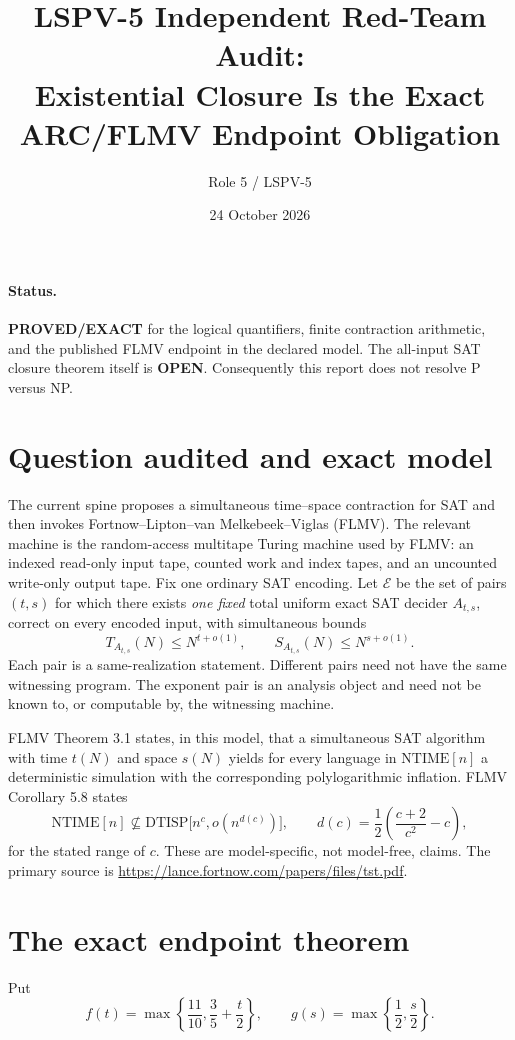\documentclass[11pt]{article}
\title{LSPV-5 Independent Red-Team Audit:\\
Existential Closure Is the Exact ARC/FLMV Endpoint Obligation}
\author{Role 5 / LSPV-5}
\date{24 October 2026}
\newcommand{\E}{\mathcal E}
\begin{document}
\maketitle

\paragraph{Status.}
\textbf{PROVED/EXACT} for the logical quantifiers, finite contraction arithmetic,
and the published FLMV endpoint in the declared model.  The all-input SAT
closure theorem itself is \textbf{OPEN}.  Consequently this report does not
resolve P versus NP.

\section{Question audited and exact model}
The current spine proposes a simultaneous time--space contraction for SAT and
then invokes Fortnow--Lipton--van Melkebeek--Viglas (FLMV).  The relevant
machine is the random-access multitape Turing machine used by FLMV: an indexed
read-only input tape, counted work and index tapes, and an uncounted write-only
output tape.  Fix one ordinary SAT encoding.  Let $\E$ be the set of pairs
$(t,s)$ for which there exists \emph{one fixed} total uniform exact SAT decider
$A_{t,s}$, correct on every encoded input, with simultaneous bounds
\[
 T_{A_{t,s}}(N)\le N^{t+o(1)},\qquad
 S_{A_{t,s}}(N)\le N^{s+o(1)}.
\]
Each pair is a same-realization statement.  Different pairs need not have the
same witnessing program.  The exponent pair is an analysis object and need not
be known to, or computable by, the witnessing machine.

FLMV Theorem 3.1 states, in this model, that a simultaneous SAT algorithm with
time $t(N)$ and space $s(N)$ yields for every language in $\mathrm{NTIME}[n]$
a deterministic simulation with the corresponding polylogarithmic inflation.
FLMV Corollary 5.8 states
\[
 \mathrm{NTIME}[n]\not\subseteq
 \mathrm{DTISP}\bigl[n^c,o(n^{d(c)})\bigr],\qquad
 d(c)=\frac12\left(\frac{c+2}{c^2}-c\right),
\]
for the stated range of $c$.  These are model-specific, not model-free,
claims.  The primary source is
\url{https://lance.fortnow.com/papers/files/tst.pdf}.

\section{The exact endpoint theorem}
Put
\[
 f(t)=\max\left\{\frac{11}{10},\frac35+\frac t2\right\},
 \qquad
 g(s)=\max\left\{\frac12,\frac s2\right\}.
\]
\end{document}
